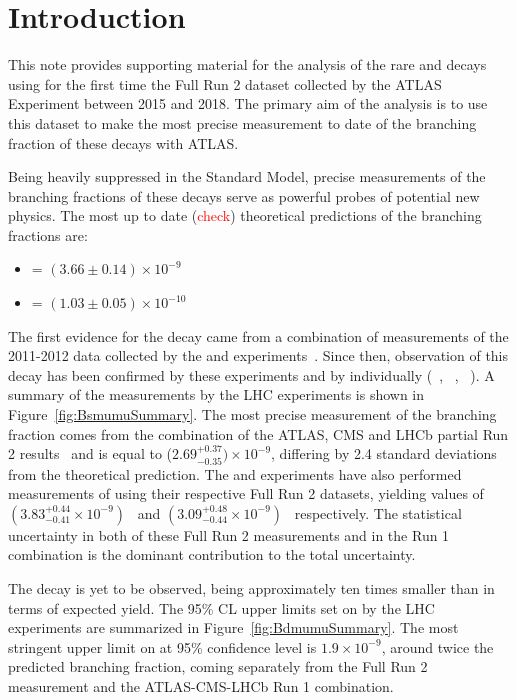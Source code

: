 \section{Introduction}
\label{sec:intro}
This note provides supporting material for the analysis of the rare \Bsmumu and \Bdmumu decays using for the first time the Full Run 2 dataset collected by the ATLAS Experiment between 2015 and 2018.
The primary aim of the analysis is to use this dataset to make the most precise measurement to date of the branching fraction of these decays with ATLAS. 

Being heavily suppressed in the Standard Model, precise measurements of the branching fractions of these decays serve as powerful probes of potential new physics. 
The most up to date (\textcolor{red}{check}) theoretical predictions of the branching fractions are: 

\begin{itemize}
    \item \BRBsmumu = $(3.66 \pm 0.14) \times 10^{-9}$ \cite{Beneke:2019slt}  
    \item \BRBdmumu = $(1.03 \pm 0.05) \times 10^{-10}$ \cite{Beneke:2019slt}  
\end{itemize}

The first evidence for the \Bsmumu decay came from a combination of measurements of the 2011-2012 data collected by the \lhcb and \cms experiments~\cite{CMS:2014xfa}.  
Since then, observation of this decay has been confirmed by these experiments and by \atlas individually (\atlas~\cite{ATLAS:2018cur}, \cms~\cite{CMS:2019bbr}, \lhcb~\cite{LHCb:2017rmj}). 
A summary of the measurements by the LHC experiments is shown in Figure~\ref{fig:BsmumuSummary}. 
The most precise measurement of the branching fraction comes from the combination of the ATLAS, CMS and LHCb partial Run 2 results~\cite{CMS-PAS-BPH-20-003} and is equal to ($2.69^{+0.37}_{-0.35}) \times 10^{-9}$, differing by 2.4 standard deviations from the theoretical prediction. 
The \cms and \lhcb experiments have also performed measurements of \BRBsmumu using their respective Full Run 2 datasets, yielding values of $(3.83^{+0.44}_{-0.41} \times 10^{-9})$~\cite{CMS:2022mgd} and $(3.09^{+0.48}_{-0.44} \times 10^{-9})$~\cite{LHCb:2021vsc} respectively. 
The statistical uncertainty in both of these Full Run 2 measurements and in the Run 1 combination is the dominant contribution to the total uncertainty. 

The decay \Bdmumu is yet to be observed, being approximately ten times smaller than \Bsmumu in terms of expected yield.  
The 95\% CL upper limits set on \BRBdmumu by the LHC experiments are summarized in Figure~\ref{fig:BdmumuSummary}.
The most stringent upper limit on \BRBdmumu at 95\% confidence level is $1.9 \times 10^{-9}$, around twice the predicted branching fraction, coming separately from the Full Run 2 \cms measurement and the ATLAS-CMS-LHCb Run 1 combination.   

